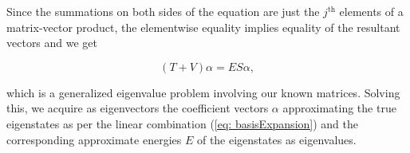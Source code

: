 \documentclass[a4paper,12pt]{article}
\begin{document}
Since the summations on both sides of the equation are just the $j^{\text{th}}$ elements of a matrix-vector product, the elementwise equality implies equality of the resultant vectors and we get

\begin{equation}
\label{eq: matrixFormFEMeq}
(T + V)\alpha = ES\alpha,
\end{equation}

which is a generalized eigenvalue problem involving our known matrices. Solving this, we acquire as eigenvectors the coefficient vectors $\alpha$ approximating the true eigenstates as per the linear combination (\ref{eq: basisExpansion}) and the corresponding approximate energies $E$ of the eigenstates as eigenvalues.




\end{document}
